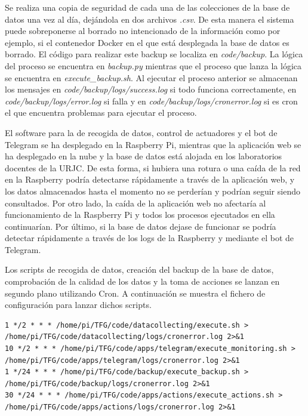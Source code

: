 \documentclass[a4paper, 12pt, oneside]{book}
\begin{document}
Se realiza una copia de seguridad de cada una de las colecciones de la base de datos una vez al día, dejándola en dos archivos \textit{.csv}. De esta manera el sistema puede sobreponerse al borrado no intencionado de la información como por ejemplo, si el contenedor Docker en el que está desplegada la base de datos es borrado.
El código para realizar este backup se localiza en \textit{code/backup}. La lógica del proceso se encuentra en \textit{backup.py} mientras que el proceso que lanza la lógica se encuentra en \textit{execute\_backup.sh}. 
Al ejecutar el proceso anterior se almacenan los mensajes en \textit{code/backup/logs/success.log} si todo funciona correctamente, en \textit{code/backup/logs/error.log} si falla y en \textit{code/backup/logs/cronerror.log} si es cron el que encuentra problemas para ejecutar el proceso.

El software para la de recogida de datos, control de actuadores y el bot de Telegram se ha desplegado en la Raspberry Pi, mientras que la aplicación web se ha desplegado en la nube y la base de datos está alojada en los laboratorios docentes de la URJC. De esta forma, si hubiera una rotura o una caída de la red en la Raspberry podría detectarse rápidamente a través de la aplicación web, y los datos almacenados hasta el momento no se perderían y podrían seguir siendo consultados. Por otro lado, la caída de la aplicación web no afectaría al funcionamiento de la Raspberry Pi y todos los procesos ejecutados en ella continuarían. Por último, si la base de datos dejase de funcionar se podría detectar rápidamente a través de los logs de la Raspberry y mediante el bot de Telegram.
 
Los scripts de recogida de datos, creación del backup de la base de datos, comprobación de la calidad de los datos y la toma de acciones se lanzan en segundo plano utilizando Cron. A continuación se muestra el fichero de configuración para lanzar dichos scripts.

\begin{lstlisting}
1 */2 * * * /home/pi/TFG/code/datacollecting/execute.sh > /home/pi/TFG/code/datacollecting/logs/cronerror.log 2>&1
10 */2 * * * /home/pi/TFG/code/apps/telegram/execute_monitoring.sh > /home/pi/TFG/code/apps/telegram/logs/cronerror.log 2>&1
1 */24 * * * /home/pi/TFG/code/backup/execute_backup.sh > /home/pi/TFG/code/backup/logs/cronerror.log 2>&1
30 */24 * * * /home/pi/TFG/code/apps/actions/execute_actions.sh > /home/pi/TFG/code/apps/actions/logs/cronerror.log 2>&1
\end{lstlisting}
\end{document}
